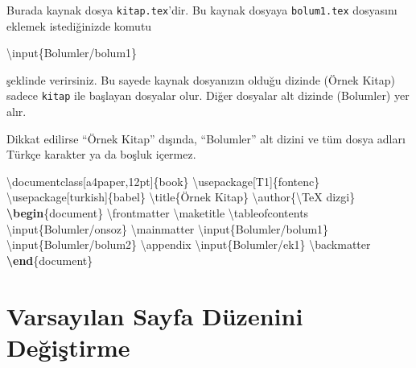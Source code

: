 \documentclass[
  10pt,
]{scrbook}
\newenvironment{Shaded}{}{}
\newcommand{\BuiltInTok}[1]{#1}
\newcommand{\ExtensionTok}[1]{#1}
\newcommand{\FunctionTok}[1]{\textcolor[rgb]{0.02,0.16,0.49}{#1}}
\newcommand{\KeywordTok}[1]{\textcolor[rgb]{0.00,0.44,0.13}{\textbf{#1}}}
\newcommand{\NormalTok}[1]{#1}
\theoremstyle{definition}
\theoremstyle{definition}
\theoremstyle{definition}
\theoremstyle{definition}
\theoremstyle{remark}
\begin{document}
Burada kaynak dosya \texttt{kitap.tex}'dir. Bu kaynak dosyaya \texttt{bolum1.tex} dosyasını eklemek istediğinizde komutu

\begin{Shaded}
\begin{Highlighting}[]
\FunctionTok{\textbackslash{}input}\NormalTok{\{Bolumler/bolum1\}}
\end{Highlighting}
\end{Shaded}

şeklinde verirsiniz. Bu sayede kaynak dosyanızın olduğu dizinde (Örnek Kitap) sadece \texttt{kitap} ile başlayan dosyalar olur. Diğer dosyalar alt dizinde (Bolumler) yer alır.

Dikkat edilirse ``Örnek Kitap'' dışında, ``Bolumler'' alt dizini ve tüm dosya adları Türkçe karakter ya da boşluk içermez.

\begin{Shaded}
\begin{Highlighting}[]
\BuiltInTok{\textbackslash{}documentclass}\NormalTok{[a4paper,12pt]\{}\ExtensionTok{book}\NormalTok{\}}
\BuiltInTok{\textbackslash{}usepackage}\NormalTok{[T1]\{}\ExtensionTok{fontenc}\NormalTok{\}}
\BuiltInTok{\textbackslash{}usepackage}\NormalTok{[turkish]\{}\ExtensionTok{babel}\NormalTok{\}}
\FunctionTok{\textbackslash{}title}\NormalTok{\{Örnek Kitap\}}
\FunctionTok{\textbackslash{}author}\NormalTok{\{}\FunctionTok{\textbackslash{}TeX}\NormalTok{ dizgi\}}
\KeywordTok{\textbackslash{}begin}\NormalTok{\{}\ExtensionTok{document}\NormalTok{\}}
\FunctionTok{\textbackslash{}frontmatter}
\FunctionTok{\textbackslash{}maketitle}
\FunctionTok{\textbackslash{}tableofcontents}
\FunctionTok{\textbackslash{}input}\NormalTok{\{Bolumler/onsoz\}}
\FunctionTok{\textbackslash{}mainmatter}
\FunctionTok{\textbackslash{}input}\NormalTok{\{Bolumler/bolum1\}}
\FunctionTok{\textbackslash{}input}\NormalTok{\{Bolumler/bolum2\}}
\FunctionTok{\textbackslash{}appendix}
\FunctionTok{\textbackslash{}input}\NormalTok{\{Bolumler/ek1\}}
\FunctionTok{\textbackslash{}backmatter}
\KeywordTok{\textbackslash{}end}\NormalTok{\{}\ExtensionTok{document}\NormalTok{\}}
\end{Highlighting}
\end{Shaded}

\hypertarget{varsayux131lan-sayfa-duxfczenini-deux11fiux15ftirme}{%
\section{Varsayılan Sayfa Düzenini Değiştirme}\label{varsayux131lan-sayfa-duxfczenini-deux11fiux15ftirme}}
\end{document}

